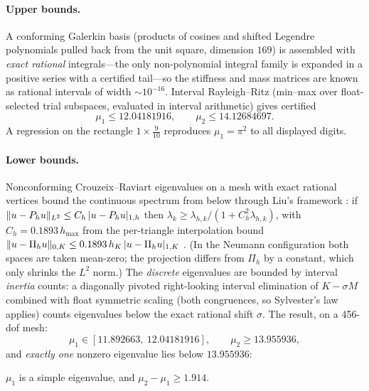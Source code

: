 \documentclass[11pt]{article}
\begin{document}
\paragraph{Upper bounds.}
A conforming Galerkin basis (products of cosines and shifted Legendre
polynomials pulled back from the unit square, dimension $169$) is
assembled with \emph{exact rational} integrals---the only
non-polynomial integral family is expanded in a positive series with a
certified tail---so the stiffness and mass matrices are known as
rational intervals of width ${\sim}10^{-16}$. Interval Rayleigh--Ritz
(min--max over float-selected trial subspaces, evaluated in interval
arithmetic) gives certified
\begin{equation}\label{eq:uppers}
\mu_1 \le 12.04181916, \qquad \mu_2 \le 14.12684697 .
\end{equation}
A regression on the rectangle $1\times\frac{9}{10}$ reproduces
$\mu_1=\pi^2$ to all displayed digits.

\paragraph{Lower bounds.}
Nonconforming Crouzeix--Raviart \cite{CrouzeixRaviart} eigenvalues on a
mesh with exact rational vertices bound the continuous spectrum from
below through Liu's framework \cite{Liu2015}: if
$\lVert u-P_hu \rVert_{L^2}\le C_h\,|u-P_hu|_{1,h}$ then
$\lambda_k \ge \lambda_{h,k}/(1+C_h^2\lambda_{h,k})$, with
$C_h=0.1893\,h_{\max}$ from the per-triangle interpolation bound
$\lVert u-\Pi_hu \rVert_{0,K}\le 0.1893\,h_K\,|u-\Pi_hu|_{1,K}$
\cite{YouXieLiu}. (In the Neumann configuration both spaces are taken
mean-zero; the projection differs from $\Pi_h$ by a constant, which only
shrinks the $L^2$ norm.) The \emph{discrete} eigenvalues are bounded by
interval \emph{inertia} counts: a diagonally pivoted right-looking
interval elimination of $K-\sigma M$ combined with float symmetric
scaling (both congruences, so Sylvester's law applies) counts
eigenvalues below the exact rational shift $\sigma$. The result, on a
456-dof mesh:
\begin{equation}\label{eq:spec}
\mu_1 \in [11.892663,\ 12.04181916], \qquad \mu_2 \ge 13.955936,
\end{equation}
and \emph{exactly one} nonzero eigenvalue lies below $13.955936$:

\begin{proposition}[simplicity]\label{prop:simple}
$\mu_1$ is a simple eigenvalue, and $\mu_2-\mu_1 \ge 1.914$.
\end{proposition}
\end{document}
